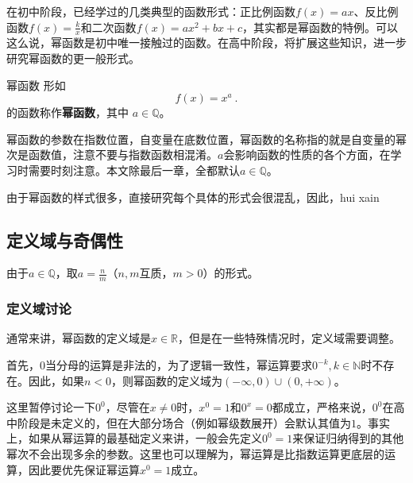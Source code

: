 
\begin{issues}
\issueDraft
\end{issues}


在初中阶段，已经学过的几类典型的函数形式：正比例函数$f(x) = ax$、反比例函数$f(x) = \frac{k}{x}$和二次函数$f(x) = ax^2+bx+c$，其实都是幂函数的特例。可以这么说，幂函数是初中唯一接触过的函数。在高中阶段，将扩展这些知识，进一步研究幂函数的更一般形式。

\begin{definition}{幂函数}
形如
\begin{equation}
f(x) = x^a~.
\end{equation}
的函数称作\textbf{幂函数}，其中 $a\in\mathbb Q$。
\end{definition}
幂函数的参数在指数位置，自变量在底数位置，幂函数的名称指的就是自变量的幂次是函数值，注意不要与指数函数相混淆。$a$会影响函数的性质的各个方面，在学习时需要时刻注意。本文除最后一章，全都默认$a\in\mathbb Q$。


由于幂函数的样式很多，直接研究每个具体的形式会很混乱，因此，hui xain

\subsection{定义域与奇偶性}

由于$a\in\mathbb Q$，取$\displaystyle a=\frac{n}{m}$（$n,m$互质，$m>0$）的形式。

\subsubsection{定义域讨论}

通常来讲，幂函数的定义域是$x\in\mathbb{R}$，但是在一些特殊情况时，定义域需要调整。

首先，$0$当分母的运算是非法的，为了逻辑一致性，幂运算要求$0^{-k},k\in \mathbb{N}$时不存在。因此，如果$n<0$，则幂函数的定义域为$({-\infty},0)\cup(0,{+\infty})$。

这里暂停讨论一下$0^0$，尽管在$x\neq0$时，$x^0=1$和$0^x=0$都成立，严格来说，$0^0$在高中阶段是未定义的，但在大部分场合（例如幂级数展开）会默认其值为$1$。事实上，如果从幂运算的最基础定义来讲，一般会先定义$0^0=1$来保证归纳得到的其他幂次不会出现多余的参数。这里也可以理解为，幂运算是比指数运算更底层的运算，因此要优先保证幂运算$x^0=1$成立。

